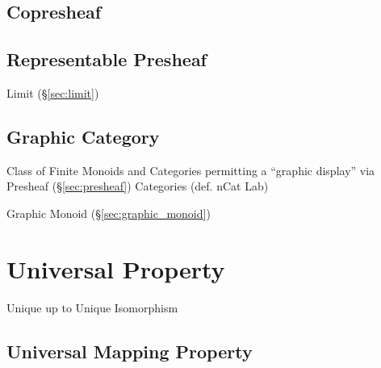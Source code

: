 \subsection{Copresheaf}\label{sec:copresheaf}



\subsection{Representable Presheaf}\label{sec:representable_presheaf}

Limit (\S\ref{sec:limit})



\subsection{Graphic Category}\label{sec:graphic_category}

Class of Finite Monoids and Categories permitting a ``graphic
display'' via Presheaf (\S\ref{sec:presheaf}) Categories
(def. nCat Lab) %

Graphic Monoid (\S\ref{sec:graphic_monoid})



\section{Universal Property}\label{sec:universal_property}

Unique up to Unique Isomorphism



\subsection{Universal Mapping Property}
\label{sec:universal_mapping_property}

